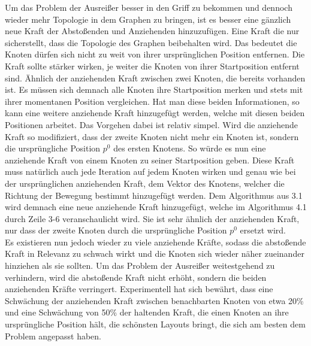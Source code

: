 Um das Problem der Ausreißer besser in den Griff zu bekommen und dennoch wieder mehr Topologie in dem Graphen zu bringen, ist es besser eine gänzlich neue Kraft der Abstoßenden und Anziehenden hinzuzufügen. Eine Kraft die nur sicherstellt, dass die Topologie des Graphen beibehalten wird. Das bedeutet die Knoten dürfen sich nicht zu weit von ihrer ursprünglichen Position entfernen. Die Kraft sollte stärker wirken, je weiter die Knoten von ihrer Startposition entfernt sind. Ähnlich der anziehenden Kraft zwischen zwei Knoten, die bereits vorhanden ist. Es müssen sich demnach alle Knoten ihre Startposition merken und stets mit ihrer momentanen Position vergleichen. Hat man diese beiden Informationen, so kann eine weitere anziehende Kraft hinzugefügt werden, welche mit diesen beiden Positionen arbeitet. Das Vorgehen dabei ist relativ simpel. Wird die anziehende Kraft so modifiziert, dass der zweite Knoten nicht mehr ein Knoten ist, sondern die ursprüngliche Position $p^{0}$ des ersten Knotens. So würde es nun eine anziehende Kraft von einem Knoten zu seiner Startposition geben. Diese Kraft muss natürlich auch jede Iteration auf jedem Knoten wirken und genau wie bei der ursprünglichen anziehenden Kraft, dem Vektor des Knotens, welcher die Richtung der Bewegung bestimmt hinzugefügt werden. Dem Algorithmus aus 3.1 wird demnach eine neue anziehende Kraft hinzugefügt, welche im Algorithmus 4.1 durch Zeile 3-6 veranschaulicht wird. Sie ist sehr ähnlich der anziehenden Kraft, nur dass der zweite Knoten durch die ursprüngliche Position $p^{0}$ ersetzt wird. \\
 


Es existieren nun jedoch wieder zu viele anziehende Kräfte, sodass die abstoßende Kraft in Relevanz zu schwach wirkt und die Knoten sich wieder näher zueinander hinziehen als sie sollten. Um das Problem der Ausreißer weitestgehend zu verhindern, wird die abstoßende Kraft nicht erhöht, sondern die beiden anziehenden Kräfte verringert. Experimentell hat sich bewährt, dass eine Schwächung der anziehenden Kraft zwischen benachbarten Knoten von etwa 20\% und eine Schwächung von 50\% der haltenden Kraft, die einen Knoten an ihre ursprüngliche Position hält, die schönsten Layouts bringt, die sich am besten dem Problem angepasst haben. \\

